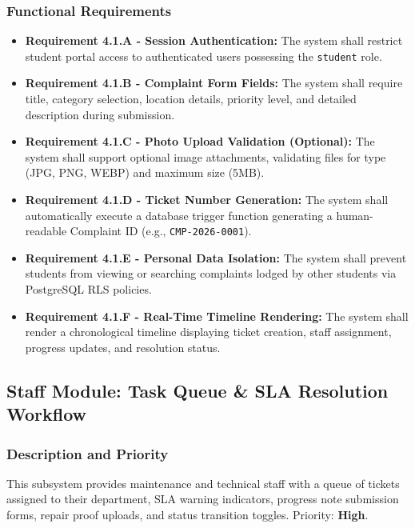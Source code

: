 \documentclass[12pt, a4paper]{article}
\begin{document}
\subsubsection{Functional Requirements}
\begin{itemize}[leftmargin=*]
    \item \textbf{Requirement 4.1.A - Session Authentication:} The system shall restrict student portal access to authenticated users possessing the \texttt{student} role.
    \item \textbf{Requirement 4.1.B - Complaint Form Fields:} The system shall require title, category selection, location details, priority level, and detailed description during submission.
    \item \textbf{Requirement 4.1.C - Photo Upload Validation (Optional):} The system shall support optional image attachments, validating files for type (JPG, PNG, WEBP) and maximum size (5MB).
    \item \textbf{Requirement 4.1.D - Ticket Number Generation:} The system shall automatically execute a database trigger function generating a human-readable Complaint ID (e.g., \texttt{CMP-2026-0001}).
    \item \textbf{Requirement 4.1.E - Personal Data Isolation:} The system shall prevent students from viewing or searching complaints lodged by other students via PostgreSQL RLS policies.
    \item \textbf{Requirement 4.1.F - Real-Time Timeline Rendering:} The system shall render a chronological timeline displaying ticket creation, staff assignment, progress updates, and resolution status.
\end{itemize}

\subsection{Staff Module: Task Queue \& SLA Resolution Workflow}

\subsubsection{Description and Priority}
This subsystem provides maintenance and technical staff with a queue of tickets assigned to their department, SLA warning indicators, progress note submission forms, repair proof uploads, and status transition toggles. Priority: \textbf{High}.
\end{document}
